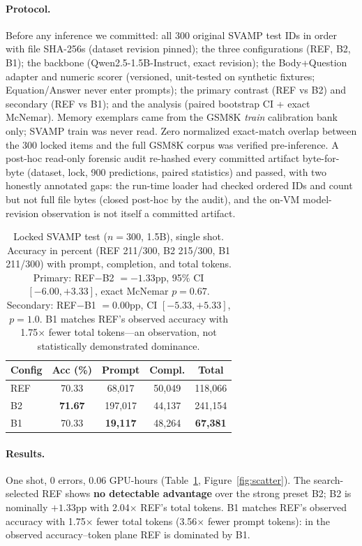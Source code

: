 \documentclass[11pt]{article}
\begin{document}
\paragraph{Protocol.} Before any inference we committed: all 300 original
SVAMP test IDs in order with file SHA-256s (dataset revision pinned); the
three configurations (REF, B2, B1); the backbone (Qwen2.5-1.5B-Instruct,
exact revision); the Body+Question adapter and numeric scorer (versioned,
unit-tested on synthetic fixtures; Equation/Answer never enter prompts);
the primary contrast (REF vs B2) and secondary (REF vs B1); and the
analysis (paired bootstrap CI + exact McNemar). Memory exemplars came from
the GSM8K \emph{train} calibration bank only; SVAMP train was never read.
Zero normalized exact-match overlap between the 300 locked items and the
full GSM8K corpus was verified pre-inference. A post-hoc read-only forensic
audit re-hashed every committed artifact byte-for-byte (dataset, lock, 900
predictions, paired statistics) and passed, with two honestly annotated
gaps: the run-time loader had checked ordered IDs and count but not full
file bytes (closed post-hoc by the audit), and the on-VM model-revision
observation is not itself a committed artifact.

\begin{table}[t]
\centering\small
\begin{tabular}{@{}lcccc@{}}
\toprule
Config & Acc (\%) & Prompt & Compl. & Total \\
\midrule
REF & 70.33 & 68{,}017 & 50{,}049 & 118{,}066 \\
B2  & \textbf{71.67} & 197{,}017 & 44{,}137 & 241{,}154 \\
B1  & 70.33 & \textbf{19{,}117} & 48{,}264 & \textbf{67{,}381} \\
\bottomrule
\end{tabular}
\caption{Locked SVAMP test ($n{=}300$, 1.5B), single shot. Accuracy in
percent (REF 211/300, B2 215/300, B1 211/300) with prompt, completion, and
total tokens. Primary: REF$-$B2 $= -1.33$pp, 95\% CI $[-6.00, +3.33]$,
exact McNemar $p{=}0.67$. Secondary: REF$-$B1 $= 0.00$pp, CI
$[-5.33, +5.33]$, $p{=}1.0$. B1 matches REF's observed accuracy with
1.75$\times$ fewer total tokens---an observation, not statistically
demonstrated dominance.}
\label{tab:f2}
\end{table}

\paragraph{Results.} One shot, 0 errors, 0.06 GPU-hours
(Table~\ref{tab:f2}, Figure~\ref{fig:scatter}). The search-selected REF
shows \textbf{no detectable advantage} over the strong preset B2; B2 is
nominally $+1.33$pp with 2.04$\times$ REF's total tokens. B1 matches REF's
observed accuracy with 1.75$\times$ fewer total tokens (3.56$\times$ fewer
prompt tokens): in the observed accuracy--token plane REF is dominated by
B1.
\end{document}

